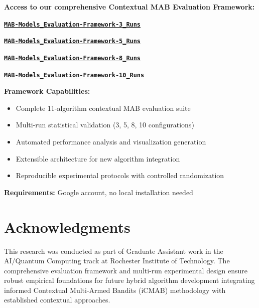 \documentclass[12pt,a4paper]{article}
\newcommand{\colab}[1]{\textcolor{colabcolor}{\textbf{#1}}}
\begin{document}
\begin{tcolorbox}[colback=colabcolor!20,colframe=colabcolor,title=\textbf{Interactive Framework Access}]

\begin{center}
\textbf{Access to our comprehensive Contextual MAB Evaluation Framework:}
\vspace{0.3cm}

\href{https://colab.research.google.com/drive/PLACEHOLDER_3_RUNS}{\colab{\texttt{MAB-Models\_Evaluation-Framework-3\_Runs}}}

\href{https://colab.research.google.com/drive/PLACEHOLDER_5_RUNS}{\colab{\texttt{MAB-Models\_Evaluation-Framework-5\_Runs}}}

\href{https://colab.research.google.com/drive/PLACEHOLDER_8_RUNS}{\colab{\texttt{MAB-Models\_Evaluation-Framework-8\_Runs}}}

\href{https://colab.research.google.com/drive/PLACEHOLDER_10_RUNS}{\colab{\texttt{MAB-Models\_Evaluation-Framework-10\_Runs}}}

\vspace{0.3cm}
\textbf{Framework Capabilities:}
\begin{itemize}
\item Complete 11-algorithm contextual MAB evaluation suite
\item Multi-run statistical validation (3, 5, 8, 10 configurations)
\item Automated performance analysis and visualization generation
\item Extensible architecture for new algorithm integration
\item Reproducible experimental protocols with controlled randomization
\end{itemize}

\textbf{Requirements:} Google account, no local installation needed
\end{center}
\end{tcolorbox}

\section{Acknowledgments}

This research was conducted as part of Graduate Assistant work in the AI/Quantum Computing track at Rochester Institute of Technology. The comprehensive evaluation framework and multi-run experimental design ensure robust empirical foundations for future hybrid algorithm development integrating informed Contextual Multi-Armed Bandits (iCMAB) methodology with established contextual approaches.
\end{document}
